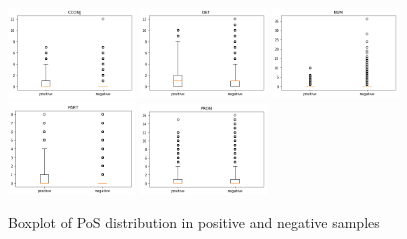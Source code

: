 \documentclass[12pt]{diazessay} %
\begin{document}
\begin{figure}[h!]
    \includegraphics[width=0.3\textwidth]{graphs/box_pos/7.png}
    \includegraphics[width=0.3\textwidth]{graphs/box_pos/8.png}
    \includegraphics[width=0.3\textwidth]{graphs/box_pos/9.png}
    \includegraphics[width=0.3\textwidth]{graphs/box_pos/10.png} \hspace{0.033\textwidth}
    \includegraphics[width=0.3\textwidth]{graphs/box_pos/11.png}

    \caption{Boxplot of PoS distribution in positive and negative samples}
    
\end{figure}


\end{document}
